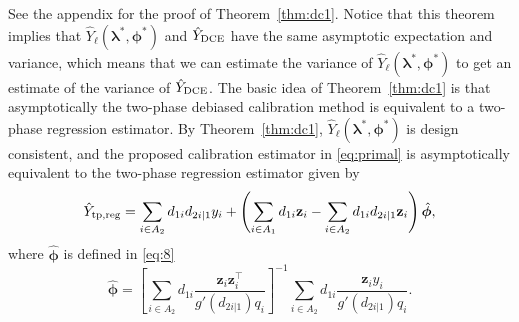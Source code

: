 \documentclass[12pt]{article}
\renewcommand{\bf}[1]{\mathbf{#1}}
\begin{document}
See the appendix for the proof of Theorem~\ref{thm:dc1}. Notice that this
theorem implies
that $\hat Y_{\ell}(\bm \lambda^*, \bm \phi^*)$ and $\hat Y_{\rm DCE}$ have
the same asymptotic expectation and variance, 
which means that we can estimate
the variance of $\hat Y_{\ell}(\bm \lambda^*, \bm \phi^*)$ to get an
estimate of the variance of $\hat Y_{\rm DCE}$. The basic idea of 
Theorem~\ref{thm:dc1} is that asymptotically the two-phase debiased calibration
method is equivalent to a two-phase regression estimator. By Theorem~\ref{thm:dc1}, 
$\hat Y_{\ell}(\bm \lambda^*, \bm \phi^*)$ is design consistent,
and the proposed calibration estimator in \eqref{eq:primal} is
asymptotically equivalent to the two-phase regression estimator given by 
  $$
  \hat Y_{\rm tp, reg}  = 
  \sum_{i \in A_2} d_{1i} d_{2i|1} y_i
  + \left(\sum_{i \in A_1} d_{1i} \bf z_i  - 
  \sum_{i \in A_2} d_{1i} d_{2i|1} \bf{z}_i \right)\hat{\bm \phi},
  $$
where $\hat{\bm \phi}$ is defined in \eqref{eq:8}
\begin{equation}
\hat{\bm \phi} = 
\left[\sum_{i \in A_2} 
d_{1i}\frac{\bf z_i \bf z_i^\top}{g'(d_{2i|1})q_i}\right]^{-1}
\sum_{i \in A_2} d_{1i}\frac{\bf z_i y_i}{g'(d_{2i|1})q_i}.
\label{eq:8}
\end{equation}
\end{document}
